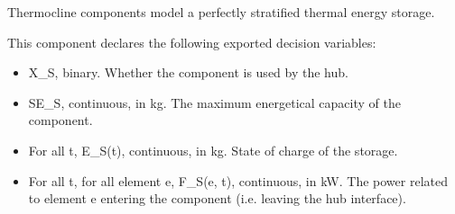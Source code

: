 \documentclass[letterpaper,10pt,english]{sphinxmanual}
\begin{document}
\begin{fulllineitems}
\label{\detokenize{generated/tamos.storage.Thermocline:tamos.storage.Thermocline}}
\pysigstartsignatures
{}
\pysigstopsignatures{}

\begin{fulllineitems}
\label{\detokenize{generated/tamos.storage.Thermocline:tamos.storage.Thermocline.__init__}}
\pysigstartsignatures
{}
\pysigstopsignatures
\sphinxAtStartPar
Thermocline components model a perfectly stratified thermal energy storage.

\sphinxAtStartPar
This component declares the following exported decision variables:
\begin{itemize}
\item {} 
\sphinxAtStartPar
X\_S, binary.
Whether the component is used by the hub.

\item {} 
\sphinxAtStartPar
SE\_S, continuous, in kg.
The maximum energetical capacity of the component.

\item {} 
\sphinxAtStartPar
For all t, E\_S(t), continuous, in kg.
State of charge of the storage.

\item {} 
\sphinxAtStartPar
For all t, for all element e, F\_S(e, t), continuous, in kW.
The power related to element e entering the component (i.e. leaving the hub interface).


\end{itemize}
\end{fulllineitems}
\end{fulllineitems}
\end{document}

